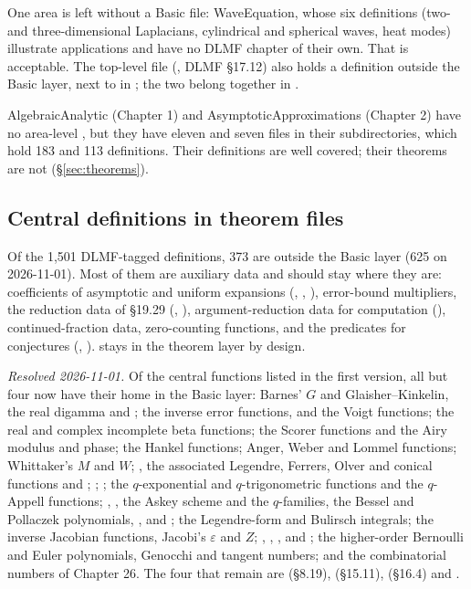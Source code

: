 \documentclass[11pt,a4paper]{article}
\newcommand{\resolved}[1]{\textit{Resolved #1.}}
\begin{document}
One area is left without a Basic file: WaveEquation, whose six definitions (two- and
three-dimensional Laplacians, cylindrical and spherical waves, heat modes) illustrate
applications and have no DLMF chapter of their own. That is acceptable. The top-level file
 (, DLMF \S17.12) also holds a definition outside the
Basic layer, next to  in ; the two
belong together in .

AlgebraicAnalytic (Chapter 1) and AsymptoticApproximations (Chapter 2) have no area-level
, but they have eleven and seven  files in their
subdirectories, which hold 183 and 113 definitions. Their definitions are well covered; their
theorems are not (\S\ref{sec:theorems}).

\subsection{Central definitions in theorem files}

Of the 1{,}501 DLMF-tagged definitions, 373 are outside the Basic layer (625 on 2026-11-01).
Most of them are auxiliary data and should stay where they are: coefficients of asymptotic and
uniform expansions (, , ), error-bound
multipliers, the reduction data of \S19.29 (, ),
argument-reduction data for computation (), continued-fraction data,
zero-counting functions, and the predicates for conjectures (,
).  stays in the theorem layer by design.

\resolved{2026-11-01} Of the central functions listed in the first version, all but four now
have their home in the Basic layer: Barnes' \(G\) and Glaisher--Kinkelin, the real digamma and
; the inverse error functions,  and the Voigt functions;
the real and complex incomplete beta functions; the Scorer functions and the Airy modulus and
phase; the Hankel functions; Anger, Weber and Lommel functions; Whittaker's \(M\) and \(W\);
, the associated Legendre, Ferrers, Olver and conical functions and
; ; ; the \(q\)-exponential and
\(q\)-trigonometric functions and the \(q\)-Appell functions; ,
, the Askey scheme and the \(q\)-families, the Bessel and Pollaczek
polynomials, ,  and
; the Legendre-form and Bulirsch integrals; the inverse Jacobian
functions, Jacobi's \(\varepsilon\) and \(Z\); , ,
,  and ; the higher-order
Bernoulli and Euler polynomials, Genocchi and tangent numbers; and the combinatorial numbers of
Chapter 26. The four that remain are  (\S8.19), 
(\S15.11),  (\S16.4) and .
\end{document}
